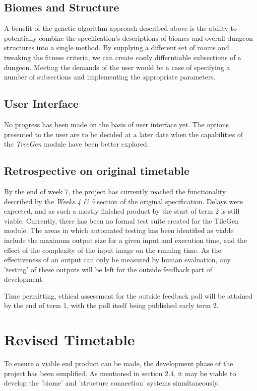\documentclass{article}
\begin{document}
\subsection{Biomes and Structure}
A benefit of the genetic algorithm approach described above is the ability to potentially combine the specification's descriptions of biomes and overall dungeon structures into a single method. By supplying a different set of rooms and tweaking the fitness criteria, we can create easily differntiable subsections of a dungeon. Meeting the demands of the user would be a case of specifying a number of subsections and implementing the appropriate parameters.

\subsection{User Interface}
No progress has been made on the basis of user interface yet. The options presented to the user are to be decided at a later date when the capabilities of the \textit{TreeGen} module have been better explored. 


\subsection{Retrospective on original timetable}
By the end of week 7, the project has currently reached the functionality described by the \textit{Weeks 4 \& 5} section of the original specification. Delays were expected, and as such a mostly finished product by the start of term 2 is still viable. Currently, there has been no formal test suite created for the TileGen module. The areas in which automated testing has been identified as viable include the maximum output size for a given input and execution time, and the effect of the complexity of the input image on the running time. As the effectiveness of an output can only be measured by human evaluation, any 'testing' of these outputs will be left for the outside feedback part of development.




Time permitting, ethical assessment for the outside feedback poll will be attained by the end of term 1, with the poll itself being published early term 2. 


\section{Revised Timetable}
To ensure a viable end product can be made, the development phase of the project has been simplified. As mentioned in section 2.4, it may be viable to develop the 'biome' and 'structure connection' systems simultaneously. 
\end{document}
